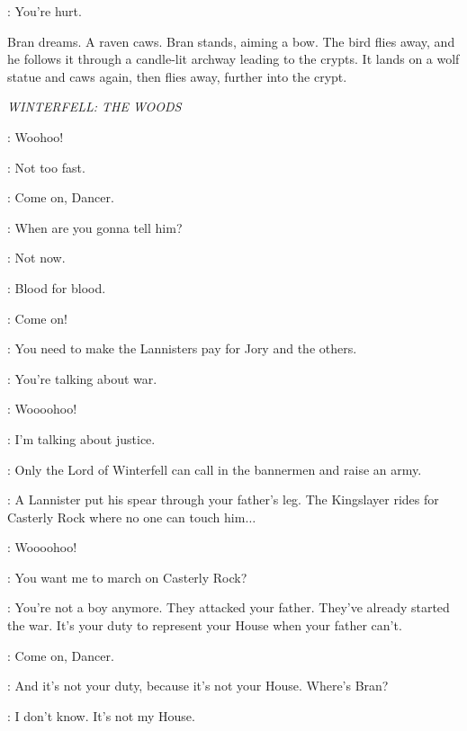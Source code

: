\DAENERYS: You're hurt. 


\scene

\n Bran dreams. A raven caws. Bran stands, aiming a bow. The bird flies away, and he follows it through a candle-lit archway leading to the crypts. It lands on a wolf statue and caws again, then flies away, further into the crypt.

\scene

\textit{WINTERFELL: THE WOODS} 


\BRAN: Woohoo! 

\ROBB: Not too fast. 

\BRAN: Come on, Dancer. 

\THEON: When are you gonna tell him? 

\ROBB: Not now. 

\THEON: Blood for blood. 

\BRAN: Come on! 

\THEON: You need to make the Lannisters pay for Jory and the others. 

\ROBB: You're talking about war. 

\BRAN: Woooohoo! 

\THEON: I'm talking about justice. 

\ROBB: Only the Lord of Winterfell can call in the bannermen and raise an army. 

\THEON: A Lannister put his spear through your father's leg. The Kingslayer rides for Casterly Rock where no one can touch him$\ldots$ 

\BRAN: Woooohoo! 

\ROBB: You want me to march on Casterly Rock? 

\THEON: You're not a boy anymore. They attacked your father. They've already started the war. It's your duty to represent your House when your father can't. 

\BRAN: Come on, Dancer. 


\ROBB: And it's not your duty, because it's not your House. Where's Bran? 

\THEON: I don't know. It's not my House. 


